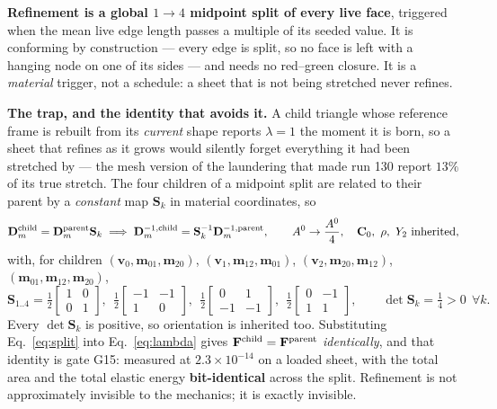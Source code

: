 \documentclass[10pt,a4paper]{article}
\begin{document}
\textbf{Refinement is a global $1\!\to\!4$ midpoint split of every live face}, triggered when the mean
live edge length passes a multiple of its seeded value. It is conforming by construction --- every edge
is split, so no face is left with a hanging node on one of its sides --- and needs no red--green
closure. It is a \emph{material} trigger, not a schedule: a sheet that is not being stretched never
refines.

\textbf{The trap, and the identity that avoids it.} A child triangle whose reference frame is rebuilt
from its \emph{current} shape reports $\lambda=1$ the moment it is born, so a sheet that refines as it
grows would silently forget everything it had been stretched by --- the mesh version of the laundering
that made run 130 report $13\%$ of its true stretch. The four children of a midpoint split are related
to their parent by a \emph{constant} map $\mathbf S_k$ in material coordinates, so
%
\begin{equation}
\mathbf D_m^{\rm child}=\mathbf D_m^{\rm parent}\mathbf S_k
\;\Longrightarrow\;
\mathbf D_m^{-1,\rm child}=\mathbf S_k^{-1}\mathbf D_m^{-1,\rm parent},
\qquad
A^0\to\frac{A^0}{4},\quad \mathbf C_0,\ \rho,\ Y_2\ \text{inherited},
\label{eq:split}
\end{equation}
%
with, for children $(\mathbf v_0,\mathbf m_{01},\mathbf m_{20})$, $(\mathbf v_1,\mathbf m_{12},
\mathbf m_{01})$, $(\mathbf v_2,\mathbf m_{20},\mathbf m_{12})$, $(\mathbf m_{01},\mathbf m_{12},
\mathbf m_{20})$,
%
\begin{equation}
\mathbf S_{1..4}=\tfrac12\begin{bmatrix}1&0\\0&1\end{bmatrix},\ \
\tfrac12\begin{bmatrix}-1&-1\\1&0\end{bmatrix},\ \
\tfrac12\begin{bmatrix}0&1\\-1&-1\end{bmatrix},\ \
\tfrac12\begin{bmatrix}0&-1\\1&1\end{bmatrix},
\qquad \det\mathbf S_k=\tfrac14>0\ \ \forall k .
\label{eq:Sk}
\end{equation}
%
Every $\det\mathbf S_k$ is positive, so orientation is inherited too. Substituting
Eq.~\eqref{eq:split} into Eq.~\eqref{eq:lambda} gives $\mathbf F^{\rm child}=\mathbf F^{\rm parent}$
\emph{identically}, and that identity is gate G15: measured at $2.3\times10^{-14}$ on a loaded sheet,
with the total area and the total elastic energy \textbf{bit-identical} across the split. Refinement is
not approximately invisible to the mechanics; it is exactly invisible.
\end{document}
